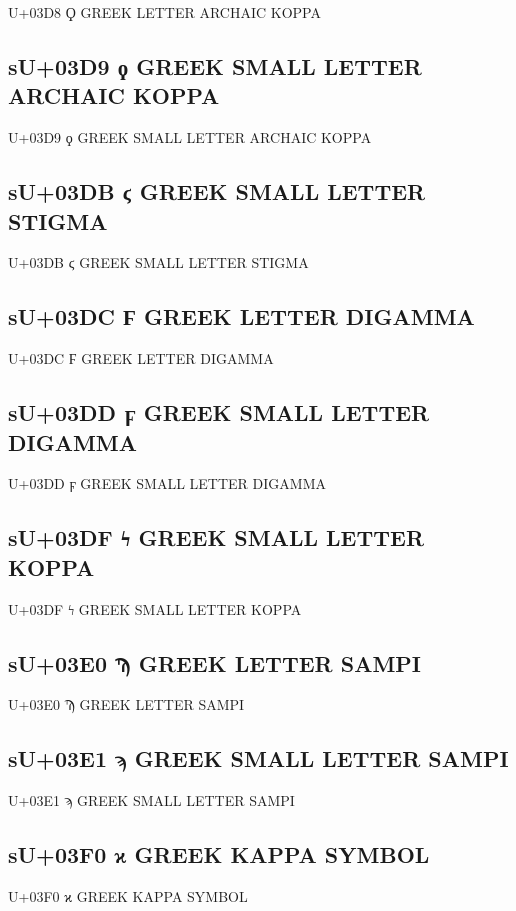 U+03D8 Ϙ GREEK LETTER ARCHAIC KOPPA

\subsection{sU+03D9 ϙ GREEK SMALL LETTER ARCHAIC KOPPA}

U+03D9 ϙ GREEK SMALL LETTER ARCHAIC KOPPA

\subsection{sU+03DB ϛ GREEK SMALL LETTER STIGMA}

U+03DB ϛ GREEK SMALL LETTER STIGMA

\subsection{sU+03DC Ϝ GREEK LETTER DIGAMMA}

U+03DC Ϝ GREEK LETTER DIGAMMA

\subsection{sU+03DD ϝ GREEK SMALL LETTER DIGAMMA}

U+03DD ϝ GREEK SMALL LETTER DIGAMMA

\subsection{sU+03DF ϟ GREEK SMALL LETTER KOPPA}

U+03DF ϟ GREEK SMALL LETTER KOPPA

\subsection{sU+03E0 Ϡ GREEK LETTER SAMPI}

U+03E0 Ϡ GREEK LETTER SAMPI

\subsection{sU+03E1 ϡ GREEK SMALL LETTER SAMPI}

U+03E1 ϡ GREEK SMALL LETTER SAMPI

\subsection{sU+03F0 ϰ GREEK KAPPA SYMBOL}

U+03F0 ϰ GREEK KAPPA SYMBOL

